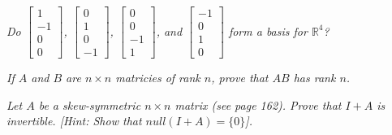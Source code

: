 \documentclass[12pt,letterpaper]{hmcpset}
\begin{document}
\newpage


\begin{problem}[3.5.48]
   \textit{ Do $\begin{bmatrix} 1 \\ -1 \\ 0\\ 0 \end{bmatrix}$, $\begin{bmatrix} 0 \\ 1 \\ 0\\ -1 \end{bmatrix}$, $\begin{bmatrix} 0 \\ 0 \\ -1\\ 1 \end{bmatrix}$, and $\begin{bmatrix} -1 \\ 0 \\ 1\\ 0 \end{bmatrix}$ form a basis for $\mathbb{R}^4$?}
\end{problem}

\begin{solution}
    \vfill
\end{solution}

\newpage


\begin{problem}[3.5.58]
    \textit{If $A$ and $B$ are $n \times n$ matricies of rank $n$, prove that $AB$ has rank $n$.}
\end{problem}

\begin{solution}
    \vfill
\end{solution}

\newpage


\begin{problem}[3.5.66(b)]
    \textit{Let $A$ be a skew-symmetric $n \times n$ matrix (see page 162). Prove that $I + A$ is invertible. [Hint: Show that $null(I + A) = \{0\}$].}
\end{problem}

\begin{solution}
    \vfill
\end{solution}
\end{document}
